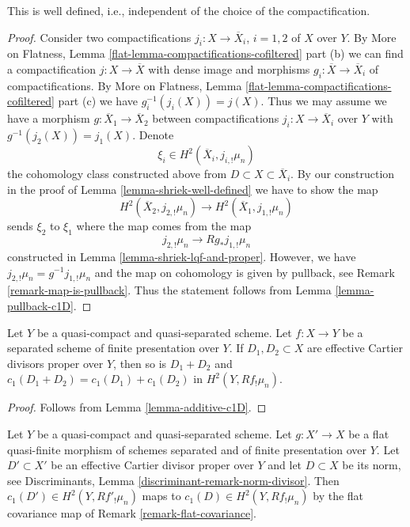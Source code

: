 \begin{lemma}
\label{lemma-well-defined-c1-divisor}
This is well defined, i.e., independent of the choice of the compactification.
\end{lemma}

\begin{proof}
Consider two compactifications $j_i : X \to \overline{X}_i$, $i = 1, 2$
of $X$ over $Y$. By More on Flatness, Lemma
\ref{flat-lemma-compactifications-cofiltered} part (b)
we can find a compactification $j : X \to \overline{X}$
with dense image and morphisms
$g_i : \overline{X} \to \overline{X}_i$ of compactifications.
By More on Flatness, Lemma
\ref{flat-lemma-compactifications-cofiltered} part (c)
we have $g_i^{-1}(j_i(X)) = j(X)$. Thus we may assume
we have a morphism $g : \overline{X}_1 \to \overline{X}_2$
between compactifications $j_i : X \to \overline{X}_i$ over $Y$
with $g^{-1}(j_2(X)) = j_1(X)$. Denote
$$
\xi_i \in H^2(\overline{X}_i, j_{i, !}\mu_n)
$$
the cohomology class constructed above from
$D \subset X \subset \overline{X}_i$.
By our construction in the proof of Lemma \ref{lemma-shriek-well-defined}
we have to show the map
$$
H^2(\overline{X}_2, j_{2, !}\mu_n)
\longrightarrow
H^2(\overline{X}_1, j_{1, !}\mu_n)
$$
sends $\xi_2$ to $\xi_1$ where the map comes from the map
$$
j_{2, !}\mu_n \longrightarrow Rg_*j_{1, !}\mu_n
$$
constructed in Lemma \ref{lemma-shriek-lqf-and-proper}.
However, we have $j_{2, !}\mu_n = g^{-1}j_{1, !}\mu_n$ and
the map on cohomology is given by pullback, see
Remark \ref{remark-map-is-pullback}.
Thus the statement follows from Lemma \ref{lemma-pullback-c1D}.
\end{proof}

\begin{lemma}
\label{lemma-additive-c1D-relative}
Let $Y$ be a quasi-compact and quasi-separated scheme. Let $f : X \to Y$
be a separated scheme of finite presentation over $Y$.
If $D_1, D_2 \subset X$ are effective Cartier divisors proper over $Y$,
then so is $D_1 + D_2$ and $c_1(D_1 + D_2) = c_1(D_1) + c_1(D_2)$
in $H^2(Y, Rf_!\mu_n)$.
\end{lemma}

\begin{proof}
Follows from Lemma \ref{lemma-additive-c1D}.
\end{proof}

\begin{lemma}
\label{lemma-flat-covariance-c1D}
Let $Y$ be a quasi-compact and quasi-separated scheme.
Let $g : X' \to X$ be a flat quasi-finite morphism of
schemes separated and of finite presentation over $Y$.
Let $D' \subset X'$ be an effective Cartier divisor proper over $Y$
and let $D \subset X$ be its norm, see
Discriminants, Lemma \ref{discriminant-remark-norm-divisor}.
Then $c_1(D') \in H^2(Y, Rf'_!\mu_n)$ maps to
$c_1(D) \in H^2(Y, Rf_!\mu_n)$ by the flat covariance map
of Remark \ref{remark-flat-covariance}.
\end{lemma}

